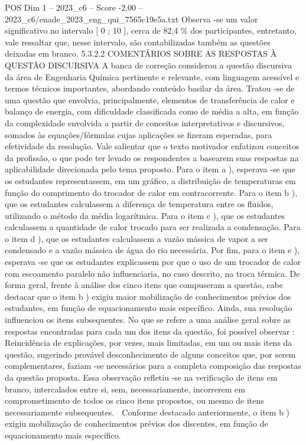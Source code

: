 \begin{textsample}{POS Dim 1 – 2023\_c6 – Score -2.00 – 2023\_c6/enade\_2023\_eng\_qui\_7565c19e5a.txt}
Observa -se um valor significativo no intervalo [ 0 ; 10 ], cerca de 82,4 \% dos participantes, entretanto, vale ressaltar que, nesse intervalo, são contabilizadas também as questões deixadas em branco. 5.3.2.2 COMENTÁRIOS SOBRE AS RESPOSTAS À QUESTÃO DISCURSIVA A banca de correção considerou a questão discursiva da área de Engenharia Química pertinente e relevante, com linguagem acessível e termos técnicos importantes, abordando conteúdo basilar da área.
Tratou -se de uma questão que envolvia, principalmente, elementos de transferência de calor e balanço de energia, com dificuldade classificada como de média a alta, em função da complexidade envolvida a partir de conceitos interpretativos e discursivos, somados às equações/fórmulas cujas aplicações se fizeram esperadas, para efetividade da resolução.
Vale salientar que o texto motivador enfatizou conceitos da profissão, o que pode ter levado os respondentes a basearem suas respostas na aplicabilidade direcionada pelo tema proposto.
Para o item a ), esperava -se que os estudantes representassem, em um gráfico, a distribuição de temperaturas em função do comprimento do trocador de calor em contracorrente.
Para o item b ), que os estudantes calculassem a diferença de temperatura entre os fluidos, utilizando o método da média logarítmica.
Para o item c ), que os estudantes calculassem a quantidade de calor trocado para ser realizada a condensação.
Para o item d ), que os estudantes calculassem a vazão mássica de vapor a ser condensado e a vazão mássica de água do rio necessária.
Por fim, para o item e ), esperava -se que os estudantes explicassem por que o uso de um trocador de calor com escoamento paralelo não influenciaria, no caso descrito, na troca térmica.
De forma geral, frente à análise dos cinco itens que compuseram a questão, cabe destacar que o item b ) exigiu maior mobilização de conhecimentos prévios dos estudantes, em função de equacionamento mais específico.
Ainda, sua resolução influenciou os itens subsequentes.
No que se refere a uma análise geral sobre as respostas encontradas para cada um dos itens da questão, foi possível observar :  Reincidência de explicações, por vezes, mais limitadas, em um ou mais itens da questão, sugerindo provável desconhecimento de alguns conceitos que, por serem complementares, faziam -se necessários para a completa composição das respostas da questão proposta.
Essa observação refletiu -se na verificação de itens em branco, intercalados entre si, sem, necessariamente, incorrerem em comprometimento de todos os cinco itens propostos, ou mesmo de itens necessariamente subsequentes.  Conforme destacado anteriormente, o item b ) exigiu mobilização de conhecimentos prévios dos discentes, em função de equacionamento mais específico.

\end{textsample}
